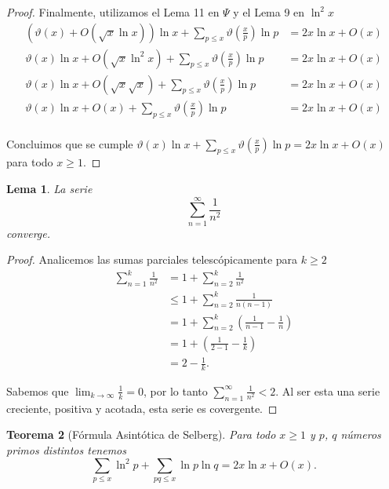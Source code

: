 \documentclass{article}
\newtheorem{theorem}{Teorema}
\newtheorem{lemma}[theorem]{Lema}
\theoremstyle{definition}
\theoremstyle{remark}
\begin{document}
\begin{proof}
Finalmente, utilizamos el Lema 11 en $\Psi$ y el Lema 9 en $\ln^2 x$
\begin{align*}
(\vartheta(x) + O(\sqrt{x}\ln x))\ln x + \sum_{p \leq x} \vartheta\left(\frac{x}{p}\right)\ln p &= 2x\ln x + O(x) \\
\vartheta(x)\ln x + O(\sqrt{x}\ln^2 x) + \sum_{p \leq x} \vartheta\left(\frac{x}{p}\right)\ln p &= 2x\ln x + O(x) \\
\vartheta(x)\ln x + O(\sqrt{x}\sqrt{x}) + \sum_{p \leq x} \vartheta\left(\frac{x}{p}\right)\ln p &= 2x\ln x + O(x) \\
\vartheta(x)\ln x + O(x) + \sum_{p \leq x} \vartheta\left(\frac{x}{p}\right)\ln p &= 2x\ln x + O(x) \\
\end{align*}

Concluimos que se cumple $\vartheta(x)\ln x + \sum_{p \leq x} \vartheta\left(\frac{x}{p}\right)\ln p = 2x\ln x + O(x)$ para todo $x \geq 1$.
\end{proof}

\begin{lemma}
La serie
$$\sum_{n = 1}^\infty \frac{1}{n ^ 2}$$
converge.
\end{lemma}

\begin{proof}
Analicemos las sumas parciales telesc\'opicamente para $k \geq 2$
\begin{align*}
\sum_{n = 1}^k \frac{1}{n^2} &= 1 + \sum_{n = 2}^k \frac{1}{n^2} \\
&\leq 1 + \sum_{n = 2}^k \frac{1}{n (n - 1)} \\
&= 1 + \sum_{n = 2}^k \left(\frac{1}{n - 1} - \frac{1}{n}\right) \\
&= 1 + \left(\frac{1}{2 - 1} - \frac{1}{k}\right) \\
&= 2 - \frac{1}{k}.
\end{align*}

Sabemos que $\lim_{k \to \infty} \frac{1}{k} = 0$,
por lo tanto $\sum_{n = 1}^\infty \frac{1}{n ^ 2} < 2$.
Al ser esta una serie creciente, positiva y acotada, esta serie es covergente.
\end{proof}

\begin{theorem}[F\'ormula Asint\'otica de Selberg]
Para todo $x \geq 1$ y $p$, $q$ n\'umeros primos distintos tenemos
$$\sum_{p \leq x} \ln^2 p + \sum_{pq \leq x} \ln p \ln q = 2x\ln x + O(x).$$
\end{theorem}
\end{document}
